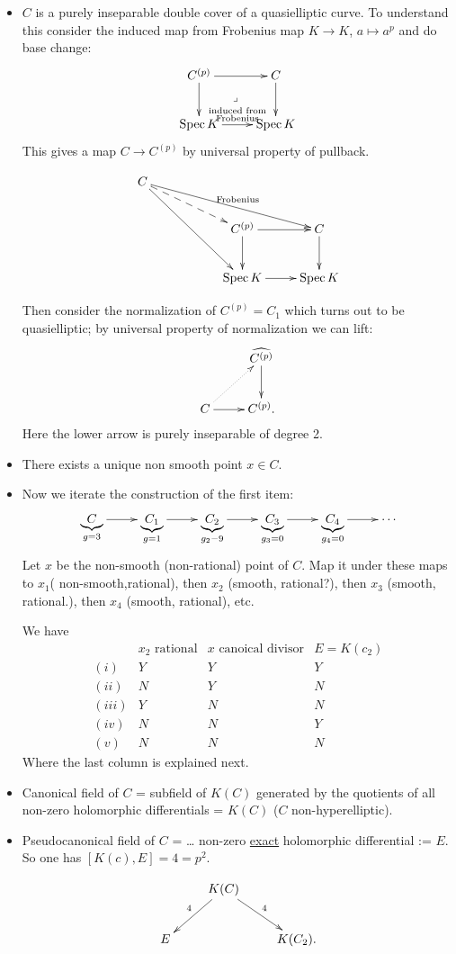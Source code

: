 \begin{itemize}
\item $C$ is a purely inseparable double
cover of a quasielliptic curve.
To understand this consider the induced map
from
Frobenius map $K \to K$, $a \mapsto a^p$ and
do base change:
$$
\xymatrix{
C^{(p)}\ar[r]\ar[d]\ar@{}[dr]|-{\lrcorner}&
C\ar[d]\\
\Spec K\ar[r]^{\substack{\text{induced from}
\\ \text{Frobenius}}}&\Spec K
}
$$
This gives a map $C \to C^{(p)}$ by universal
property of pullback.

$$
\xymatrix{
C \ar[rrrd]^{\text{Frobenius}}
\ar@{-->}[rrd]\ar[rrdd] & & \\
& &  C^{(p)}\ar[d] \ar[r] & C \ar[d] \\
& &  \Spec K\ar[r] & \Spec K
}
$$

Then consider the normalization of
$C^{(p)}=C_1$ which
turns out to be quasielliptic; by universal
property of normalization we can lift:
$$
\xymatrix{
& \widehat{C^{(p)}}\ar[d]\\
C\ar@{.>}[ur]\ar[r]&C^{(p)}.
}
$$
Here the lower arrow is purely inseparable of
degree 2.

\item There exists a unique non smooth point
$x \in C$.

\item Now we iterate the construction of the
first item:
$$
\xymatrix{
\underbrace{C}_{g=3}\ar[r]&\underbrace{C_1}
_{g=1}\ar[r]&
\underbrace{C_2}_{g_2-9}\ar[r]&
\underbrace{C_3}_{g_3=0}\ar[r]&
\underbrace{C_4}_{g_4=0}\ar[r]&\cdots
}
$$
Let $x$ be the non-smooth (non-rational)
point of $C$. Map it under
these maps to $x_1$( non-smooth,rational),
then  $x_2$ (smooth, rational?),
then $x_3 $ (smooth, rational.), then $x_4$
(smooth, rational), etc.

We have
$$
\begin{matrix}
&\text{$x_2$ rational}& \text{$x$ canoical
divisor} &
E=K(c_2)\\
(i)& Y & Y & Y\\
(ii) & N & Y & N\\
(iii) & Y & N & N\\
(iv) & N & N & Y\\
(v) & N & N & N
\end{matrix}
$$
Where the last column is explained next.

\item Canonical field of $C$ = subfield of
$K(C)$ generated
by the quotients of all non-zero holomorphic
differentials
=  $K(C)$ ($C$ non-hyperelliptic).

\item Pseudocanonical field of $C$ = …
non-zero \underline{exact}
holomorphic differential := $E$. So one has
$[K(c),E]=4=p^2$.

$$
\xymatrix{
&K(C)\ar[ld]_{4}\ar[rd]^{4}\\
E&&K(C_2).
}
$$
\end{itemize}


